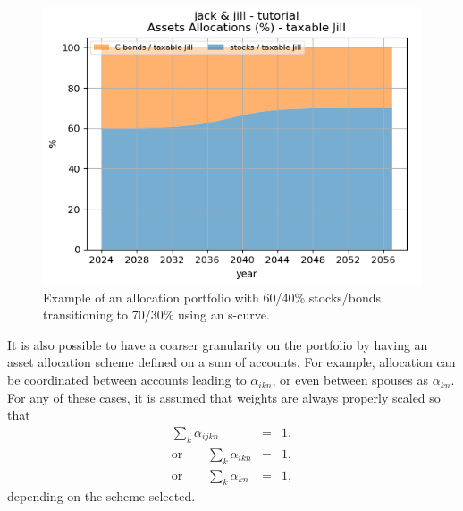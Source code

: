 \documentclass{report}[fleqn,12pt]
\begin{document}
\begin{description}[leftmargin=4em,style=multiline]
	\begin{figure}[t]
	\includegraphics{allocations.png}
		\caption{\small Example of an allocation portfolio with 60/40\% stocks/bonds 
		transitioning to 70/30\% using an s-curve. \label{Fig:allocations}}
	\end{figure}
	It is also possible to have a coarser granularity on the portfolio by
	having an asset allocation scheme
	defined on a sum of accounts. For example, allocation can be coordinated between accounts
	leading to $\alpha_{ikn}$, or even between spouses as $\alpha_{kn}$.
	For any of these cases, it is assumed that weights are always properly scaled so that
	\begin{eqnarray}
		\sum_{k} \alpha_{ijkn} &=& 1, \nonumber\\
		\text{or} \qquad \sum_{k} \alpha_{ikn} &=& 1, \nonumber\\
		\text{or} \qquad \sum_{k} \alpha_{kn} &=& 1,
	\end{eqnarray}
	depending on the scheme selected.


\end{description}
\end{document}
